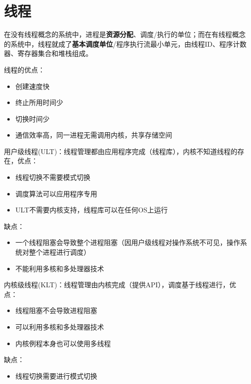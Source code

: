 
\section{线程}
在没有线程概念的系统中，进程是\textbf{资源分配}、调度/执行的单位；而在有线程概念的系统中，线程就成了\textbf{基本调度单位}/程序执行流最小单元，由线程ID、程序计数器、寄存器集合和堆栈组成。

线程的优点：
\begin{itemize}
    \item 创建速度快
    \item 终止所用时间少
    \item 切换时间少
    \item 通信效率高，同一进程无需调用内核，共享存储空间
\end{itemize}

\bigskip
用户级线程(ULT)：线程管理都由应用程序完成（线程库），内核不知道线程的存在，优点：
\begin{itemize}
    \item 线程切换不需要模式切换
    \item 调度算法可以应用程序专用
    \item ULT不需要内核支持，线程库可以在任何OS上运行
\end{itemize}
缺点：
\begin{itemize}
    \item 一个线程阻塞会导致整个进程阻塞（因用户级线程对操作系统不可见，操作系统对整个进程进行调度）
    \item 不能利用多核和多处理器技术
\end{itemize}

\bigskip
内核级线程(KLT)：线程管理由内核完成（提供API），调度基于线程进行，优点：
\begin{itemize}
    \item 线程阻塞不会导致进程阻塞
    \item 可以利用多核和多处理器技术
    \item 内核例程本身也可以使用多线程
\end{itemize}
缺点：
\begin{itemize}
    \item 线程切换需要进行模式切换
\end{itemize}

